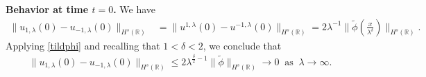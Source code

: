 \documentclass[12pt,reqno]{amsart}
\newcommand{\rr}{\mathbb{R}}
\theoremstyle{plain}  %
\theoremstyle{definition}
\begin{document}
%
{\bf Behavior at time $t=0$.}  We have
%
%
%
%
\begin{equation*}
\begin{split}
\|u_{1,\lambda}(0) - u_{-1,\lambda}(0) \|_{H^s(\rr)} & = \|u^{1,\lambda}(0) 
- u^{-1,\lambda}(0) \|_{H^s(\rr)}
= 2 \lambda^{-1} \| \tilde{\phi}\left( \frac{x}{\lambda^\delta}
\right) \|_{H^s(\rr)}.
\label{apple}
\end{split}
\end{equation*}
%
%
%
%
Applying \eqref{tildphi} and recalling that $1<\delta<2$, we conclude that
%
%
\begin{equation}
\begin{split}
	\|u_{1,\lambda}(0) - u_{-1,\lambda}(0) \|_{H^s(\rr)} \le 2
\lambda^{\frac{\delta}{2}-1} \|\tilde{\phi} \|_{H^s(\rr)} \to 0
\; \; \text{as} \; \; \lambda \to \infty.
\label{apple70}
\end{split}
\end{equation}
%
%
%
%
%  
%
\end{document}
